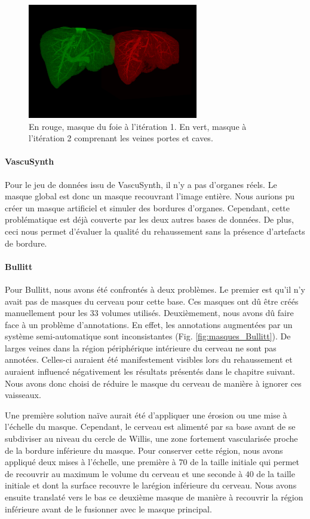 \begin{figure}[!ht]
  \centering
  \includegraphics[height=5cm]{Images/ircad_corrected_gt.png}
  \caption{En rouge, masque du foie à l'itération 1. En vert, masque à l'itération 2 comprenant les veines portes et caves.}
  \label{fig:masques_globaux_ircad}
\end{figure}

\paragraph{VascuSynth}
Pour le jeu de données issu de VascuSynth, il n'y a pas d'organes réels. Le masque global est donc un masque recouvrant l'image entière. Nous aurions pu créer un masque artificiel et simuler des bordures d'organes. Cependant, cette problématique est déjà couverte par les deux autres bases de données. De plus, ceci nous permet d'évaluer la qualité du rehaussement sans la présence d'artefacts de bordure.

\paragraph{Bullitt}
Pour Bullitt, nous avons été confrontés à deux problèmes. Le premier est qu'il n'y avait pas de masques du cerveau pour cette base. Ces masques ont dû être créés manuellement pour les 33 volumes utilisés. Deuxièmement, nous avons dû faire face à un problème d'annotations. En effet, les annotations augmentées par un système semi-automatique sont inconsistantes (Fig. \ref{fig:masques_Bullitt}). De larges veines dans la région périphérique intérieure du cerveau ne sont pas annotées. Celles-ci auraient été manifestement visibles lors du rehaussement et auraient influencé négativement les résultats présentés dans le chapitre suivant. Nous avons donc choisi de réduire le masque du cerveau de manière à ignorer ces vaisseaux.

Une première solution naïve aurait été d'appliquer une érosion ou une mise à l'échelle du masque. Cependant, le cerveau est alimenté par sa base avant de se subdiviser au niveau du cercle de Willis, une zone fortement vascularisée proche de la bordure inférieure du masque. Pour conserver cette région, nous avons appliqué deux mises à l'échelle, une première à $70$ \percent{} de la taille initiale qui permet de recouvrir au maximum le volume du cerveau et une seconde à $40$ \percent{} de la taille initiale et dont la surface recouvre le larégion inférieure du cerveau. Nous avons ensuite translaté vers le bas ce deuxième masque de manière à recouvrir la région inférieure avant de le fusionner avec le masque principal.


